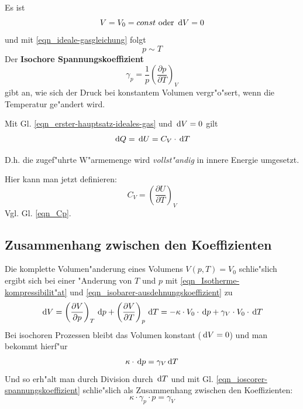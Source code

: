 Es ist 
$$
V = V_0 = const \text{ oder } { \ensuremath{\, \mathrm{d}}V = 0}
$$
 und mit \eqref{eqn_ideale-gasgleichung}
folgt
$$p \sim T$$
Der \textbf{Isochore Spannungskoeffizient}
\begin{equation}
   \label{eqn_ioscorer-spannungskoeffizient}
   \gamma_p = \frac{1}{p} \left ( \frac{\partial p}{\partial T} \right )_V
\end{equation}
gibt an, wie sich der Druck bei konstantem Volumen vergr"o"sert, wenn
die Temperatur ge"andert wird.

Mit Gl. \eqref{eqn_erster-hauptsatz-ideales-gas} und $\, \mathrm{d} V = 0$
gilt
\begin{equation}
   \label{eqn_waerme-aus-waermekapazitaet}
   \, \mathrm{d} Q = \, \mathrm{d} U = C_V \cdot \, \mathrm{d} T
\end{equation}
\begin{Wichtig}
D.h. die zugef"uhrte W"armemenge wird \emph{vollst"andig} in innere
Energie umgesetzt.    
\end{Wichtig}
Hier kann man jetzt definieren:
\begin{equation}
   \label{eqn_Cv}
   C_V = \left ( \frac{\partial U}{\partial T} \right )_V
\end{equation}
Vgl. Gl. \eqref{eqn_Cp}.



\subsection{Zusammenhang zwischen den Koeffizienten}
\label{kap_zusammenhang-zwischen-den-koeffizienten}
\label{kap_volumenanderung}

Die komplette Volumen"anderung eines Volumens $V(p,T) = V_0$ schlie"slich
ergibt sich bei einer "Anderung von $T$ und $p$ mit
\eqref{eqn_Isotherme-kompressibilit"at}  und
\eqref{eqn_isobarer-ausdehnungskoeffizient} zu
$$
\, \mathrm{d} V = \left ( \frac{\partial V}{\partial p} \right )_T \, \mathrm{d} p +
\left ( \frac{\partial V}{\partial T } \right )_p \, \mathrm{d} T =
- \kappa \cdot V_0 \cdot \, \mathrm{d} p + \gamma_V \cdot V_0 \cdot \, \mathrm{d} T
$$
Bei isochoren Prozessen bleibt das Volumen konstant ($\, \mathrm{d} V = 0$) und
man bekommt hierf"ur
$$
\kappa \cdot \, \mathrm{d} p = \gamma_V \, \mathrm{d} T
$$
%
%
Und so erh"alt man durch Division durch $\, \mathrm{d} T$ und mit
Gl. \eqref{eqn_ioscorer-spannungskoeffizient} schlie"slich als
Zusammenhang zwischen den Koeffizienten:
\begin{equation}
   \label{eqn_zshg-koeffizienten}
   \kappa \cdot \gamma_p \cdot p = \gamma_V 
\end{equation}




